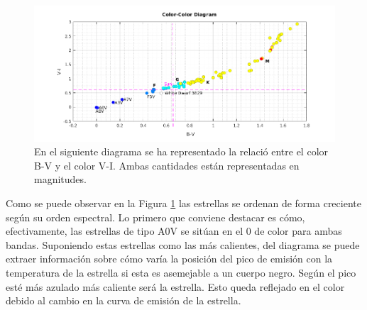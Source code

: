 \documentclass[a4paper]{article}
\begin{document}
	\begin{figure}[!htbp]
		\centering
		\begin{center}
			\includegraphics[width=15cm]{Figures/CC.png}
		\end{center}
		\caption{\footnotesize{En el siguiente diagrama se ha representado la relaci\'{o} entre el color B-V y el color V-I. Ambas cantidades est\'{a}n representadas en magnitudes.}}
		\label{CCdiag}
		\end{figure}
\hspace*{12pt} Como se puede observar en la Figura \ref{CCdiag} las estrellas se ordenan de forma creciente seg\'{u}n su orden espectral. Lo primero que conviene destacar es c\'{o}mo, efectivamente, las estrellas de tipo A0V se sit\'{u}an en el 0 de color para ambas bandas. Suponiendo estas estrellas como las m\'{a}s calientes, del diagrama se puede extraer informaci\'{o}n sobre  c\'{o}mo var\'{i}a la posici\'{o}n del pico de emisi\'{o}n con la temperatura de la estrella si esta es asemejable a un cuerpo negro. Seg\'{u}n el pico est\'{e} m\'{a}s azulado m\'{a}s caliente ser\'{a} la estrella. Esto queda reflejado en el color debido al cambio en la curva de emisi\'{o}n de la estrella.
\end{document}
